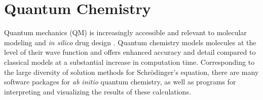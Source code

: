 \section{Quantum Chemistry}
Quantum mechanics (QM) is increasingly accessible and relevant to molecular modeling and \textit{in silico} drug design \cite{Vivo_2011}. Quantum chemistry models molecules at the level of their wave function and offers enhanced accuracy and detail compared to classical models at a substantial increase in computation time.  Corresponding to the large diversity of solution methods for Schr\"odinger's equation, there are many software packages for \textit{ab initio} quantum chemistry, as well as programs for interpreting and visualizing the results of these calculations.
